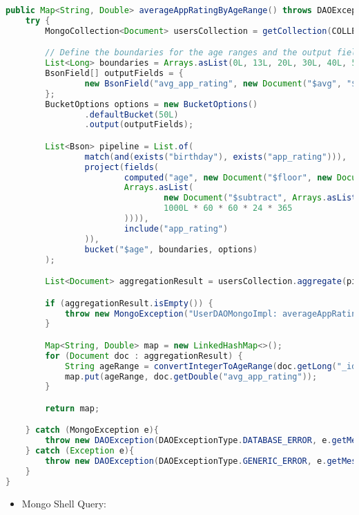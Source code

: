 \begin{mdframed}[style=customstyle]
\begin{lstlisting}[language=java]
public Map<String, Double> averageAppRatingByAgeRange() throws DAOException {
    try {
        MongoCollection<Document> usersCollection = getCollection(COLLECTION_NAME);

        // Define the boundaries for the age ranges and the output fields
        List<Long> boundaries = Arrays.asList(0L, 13L, 20L, 30L, 40L, 50L);
        BsonField[] outputFields = {
                new BsonField("avg_app_rating", new Document("$avg", "$app_rating"))
        };
        BucketOptions options = new BucketOptions()
                .defaultBucket(50L)
                .output(outputFields);

        List<Bson> pipeline = List.of(
                match(and(exists("birthday"), exists("app_rating"))),
                project(fields(
                        computed("age", new Document("$floor", new Document("$divide",
                        Arrays.asList(
                                new Document("$subtract", Arrays.asList(new Date(), "$birthday")),
                                1000L * 60 * 60 * 24 * 365
                        )))),
                        include("app_rating")
                )),
                bucket("$age", boundaries, options)
        );

        List<Document> aggregationResult = usersCollection.aggregate(pipeline).into(new ArrayList<>());

        if (aggregationResult.isEmpty()) {
            throw new MongoException("UserDAOMongoImpl: averageAppRatingByAgeRange: No data found");
        }

        Map<String, Double> map = new LinkedHashMap<>();
        for (Document doc : aggregationResult) {
            String ageRange = convertIntegerToAgeRange(doc.getLong("_id"));
            map.put(ageRange, doc.getDouble("avg_app_rating"));
        }

        return map;

    } catch (MongoException e){
        throw new DAOException(DAOExceptionType.DATABASE_ERROR, e.getMessage());
    } catch (Exception e){
        throw new DAOException(DAOExceptionType.GENERIC_ERROR, e.getMessage());
    }
}\end{lstlisting}
\end{mdframed}
    
\begin{itemize}
    \item Mongo Shell Query:
\end{itemize}

